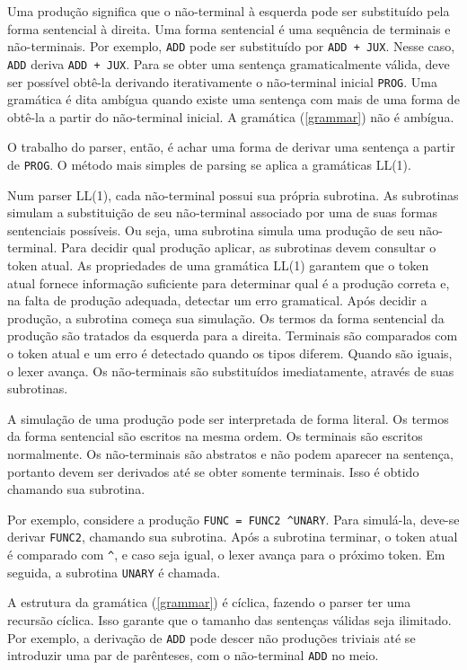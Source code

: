 \documentclass[10pt,a4paper]{article}
\begin{document}
Uma produção significa que o não-terminal à esquerda pode ser substituído pela forma sentencial à direita.
Uma forma sentencial é uma sequência de terminais e não-terminais.
Por exemplo, \texttt{ADD} pode ser substituído por \texttt{ADD + JUX}.
Nesse caso, \texttt{ADD} deriva \texttt{ADD + JUX}.
Para se obter uma sentença gramaticalmente válida,
deve ser possível obtê-la derivando iterativamente o não-terminal inicial \texttt{PROG}.
Uma gramática é dita ambígua quando existe uma sentença com mais de uma forma de
obtê-la a partir do não-terminal inicial. A gramática (\ref{grammar}) não é ambígua.

O trabalho do parser, então, é achar uma forma de derivar uma sentença a partir de \texttt{PROG}.
O método mais simples de parsing se aplica a gramáticas LL(1).

Num parser LL(1), cada não-terminal possui sua própria subrotina.
As subrotinas simulam a substituição de seu não-terminal associado por uma de suas formas sentenciais possíveis.
Ou seja, uma subrotina simula uma produção de seu não-terminal.
Para decidir qual produção aplicar, as subrotinas devem consultar o token atual.
As propriedades de uma gramática LL(1) garantem que o token atual fornece
informação suficiente para determinar qual é a produção correta e, na falta de produção adequada,
detectar um erro gramatical. Após decidir a produção, a subrotina começa sua simulação.
Os termos da forma sentencial da produção são tratados da esquerda para a direita.
Terminais são comparados com o token atual e um erro é detectado quando os tipos diferem.
Quando são iguais, o lexer avança. Os não-terminais são substituídos imediatamente, através de suas subrotinas.

A simulação de uma produção pode ser interpretada de forma literal.
Os termos da forma sentencial são escritos na mesma ordem.
Os terminais são escritos normalmente. Os não-terminais são abstratos e não podem aparecer na sentença,
portanto devem ser derivados até se obter somente terminais. Isso é obtido chamando sua subrotina.

Por exemplo, considere a produção \texttt{FUNC = FUNC2 \textasciicircum UNARY}.
Para simulá-la, deve-se derivar \texttt{FUNC2}, chamando sua subrotina.
Após a subrotina terminar, o token atual é comparado com \texttt{\textasciicircum},
e caso seja igual, o lexer avança para o próximo token. Em seguida, a subrotina \texttt{UNARY} é chamada.

A estrutura da gramática (\ref{grammar}) é cíclica, fazendo o parser ter uma recursão cíclica.
Isso garante que o tamanho das sentenças válidas seja ilimitado.
Por exemplo, a derivação de \texttt{ADD} pode descer não produções triviais até
se introduzir uma par de parênteses, com o não-terminal \texttt{ADD} no meio.
\end{document}
